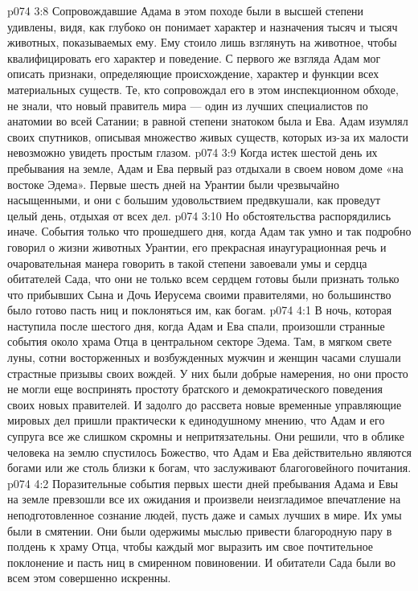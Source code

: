 \vs p074 3:8 Сопровождавшие Адама в этом походе были в высшей степени удивлены, видя, как глубоко он понимает характер и назначения тысяч и тысяч животных, показываемых ему. Ему стоило лишь взглянуть на животное, чтобы квалифицировать его характер и поведение. С первого же взгляда Адам мог описать признаки, определяющие происхождение, характер и функции всех материальных существ. Те, кто сопровождал его в этом инспекционном обходе, не знали, что новый правитель мира --- один из лучших специалистов по анатомии во всей Сатании; в равной степени знатоком была и Ева. Адам изумлял своих спутников, описывая множество живых существ, которых из\hyp{}за их малости невозможно увидеть простым глазом.
\vs p074 3:9 Когда истек шестой день их пребывания на земле, Адам и Ева первый раз отдыхали в своем новом доме «на востоке Эдема». Первые шесть дней на Урантии были чрезвычайно насыщенными, и они с большим удовольствием предвкушали, как проведут целый день, отдыхая от всех дел.
\vs p074 3:10 Но обстоятельства распорядились иначе. События только что прошедшего дня, когда Адам так умно и так подробно говорил о жизни животных Урантии, его прекрасная инаугурационная речь и очаровательная манера говорить в такой степени завоевали умы и сердца обитателей Сада, что они не только всем сердцем готовы были признать только что прибывших Сына и Дочь Иерусема своими правителями, но большинство было готово пасть ниц и поклоняться им, как богам.
\vs p074 4:1 В ночь, которая наступила после шестого дня, когда Адам и Ева спали, произошли странные события около храма Отца в центральном секторе Эдема. Там, в мягком свете луны, сотни восторженных и возбужденных мужчин и женщин часами слушали страстные призывы своих вождей. У них были добрые намерения, но они просто не могли еще воспринять простоту братского и демократического поведения своих новых правителей. И задолго до рассвета новые временные управляющие мировых дел пришли практически к единодушному мнению, что Адам и его супруга все же слишком скромны и непритязательны. Они решили, что в облике человека на землю спустилось Божество, что Адам и Ева действительно являются богами или же столь близки к богам, что заслуживают благоговейного почитания.
\vs p074 4:2 Поразительные события первых шести дней пребывания Адама и Евы на земле превзошли все их ожидания и произвели неизгладимое впечатление на неподготовленное сознание людей, пусть даже и самых лучших в мире. Их умы были в смятении. Они были одержимы мыслью привести благородную пару в полдень к храму Отца, чтобы каждый мог выразить им свое почтительное поклонение и пасть ниц в смиренном повиновении. И обитатели Сада были во всем этом совершенно искренны.
